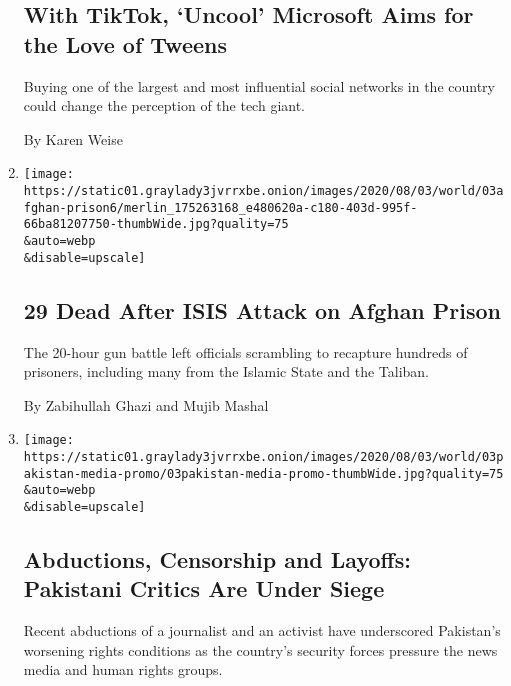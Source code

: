 \begin{enumerate}
  \hypertarget{with-tiktok-uncool-microsoft-aims-for-the-love-of-tweens}{%
  \subsection{With TikTok, `Uncool' Microsoft Aims for the Love of
  Tweens}\label{with-tiktok-uncool-microsoft-aims-for-the-love-of-tweens}}

  Buying one of the largest and most influential social networks in the
  country could change the perception of the tech giant.

  By Karen Weise
\item
  \href{/2020/08/03/world/asia/afghanistan-prison-isis-taliban.html}{}

  \texttt{[image: https://static01.graylady3jvrrxbe.onion/images/2020/08/03/world/03afghan-prison6/merlin\_175263168\_e480620a-c180-403d-995f-66ba81207750-thumbWide.jpg?quality=75\\\&auto=webp\\\&disable=upscale]}

  \hypertarget{29-dead-after-isis-attack-on-afghan-prison}{%
  \subsection{29 Dead After ISIS Attack on Afghan
  Prison}\label{29-dead-after-isis-attack-on-afghan-prison}}

  The 20-hour gun battle left officials scrambling to recapture hundreds
  of prisoners, including many from the Islamic State and the Taliban.

  By Zabihullah Ghazi and Mujib Mashal
\item
  \href{/2020/08/03/world/asia/pakistan-media-abductions.html}{}

  \texttt{[image: https://static01.graylady3jvrrxbe.onion/images/2020/08/03/world/03pakistan-media-promo/03pakistan-media-promo-thumbWide.jpg?quality=75\\\&auto=webp\\\&disable=upscale]}

  \hypertarget{abductions-censorship-and-layoffs-pakistani-critics-are-under-siege}{%
  \subsection{Abductions, Censorship and Layoffs: Pakistani Critics Are
  Under
  Siege}\label{abductions-censorship-and-layoffs-pakistani-critics-are-under-siege}}

  Recent abductions of a journalist and an activist have underscored
  Pakistan's worsening rights conditions as the country's security
  forces pressure the news media and human rights groups.


\end{enumerate}
